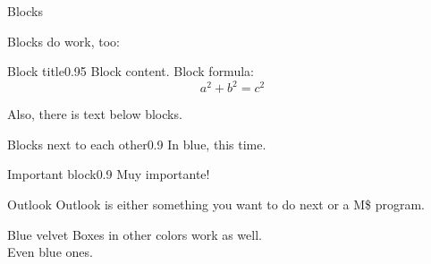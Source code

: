 \begin{greenbox}{Blocks}

  Blocks do work, too:\\
  \begin{greenblock}{Block title}{0.95\textwidth} %
    Block content. Block formula:\\
    \[ a^2+b^2=c^2\]
  \end{greenblock}

  Also, there is text below blocks.

  \begin{minipage}{\textwidth}
    
    \begin{minipage}{0.475\textwidth}
      \begin{blueblock}{Blocks next to each other}{0.9\textwidth}
        In blue, this time.
      \end{blueblock}
    \end{minipage}
    \begin{minipage}{0.475\textwidth}
      \begin{redblock}{Important block}{0.9\textwidth}
        Muy importante!
      \end{redblock}
    \end{minipage}
  \end{minipage}

\end{greenbox}

\begin{redbox}{Outlook}
  Outlook is either something you want to do next or a M\$ program.
\end{redbox}

\begin{bluebox}{Blue velvet}
  Boxes in other colors work as well.\\
  Even blue ones.
\end{bluebox}

